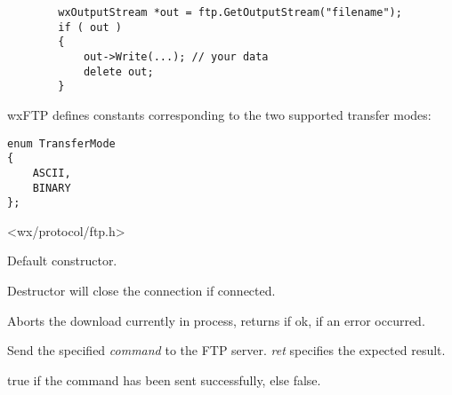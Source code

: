 \begin{verbatim}
        wxOutputStream *out = ftp.GetOutputStream("filename");
        if ( out )
        {
            out->Write(...); // your data
            delete out;
        }
\end{verbatim}


wxFTP defines constants corresponding to the two supported transfer modes:

\begin{verbatim}
enum TransferMode
{
    ASCII,
    BINARY
};
\end{verbatim}




<wx/protocol/ftp.h>






\label{wxftpctor}


Default constructor.


\label{wxftpdtor}


Destructor will close the connection if connected.


\label{wxftpabort}


Aborts the download currently in process, returns \true if ok, \false 
if an error occurred.


\label{wxftpcheckcommand}


Send the specified {\it command} to the FTP server. {\it ret} specifies
the expected result.


true if the command has been sent successfully, else false.


